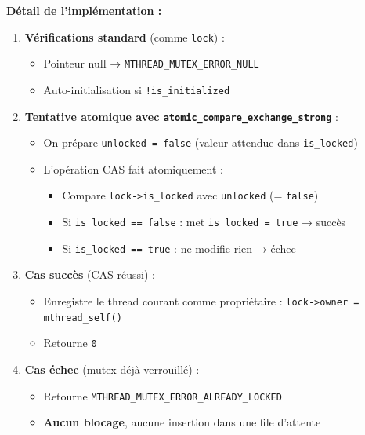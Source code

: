 \documentclass[11pt,a4paper]{article}
\let\oldtexttt\texttt
\renewcommand{\texttt}[1]{\oldtexttt{\color{keyword}#1}}
\begin{document}
\textbf{Détail de l'implémentation :}
\begin{enumerate}
  \item \textbf{Vérifications standard} (comme \texttt{lock}) :
  \begin{itemize}
    \item Pointeur null → \texttt{MTHREAD\_MUTEX\_ERROR\_NULL}
    \item Auto-initialisation si \texttt{!is\_initialized}
  \end{itemize}

  \item \textbf{Tentative atomique avec \texttt{atomic\_compare\_exchange\_strong}} :
  \begin{itemize}
    \item On prépare \texttt{unlocked = false} (valeur attendue dans \texttt{is\_locked})
    \item L'opération CAS fait atomiquement :
    \begin{itemize}
      \item Compare \texttt{lock->is\_locked} avec \texttt{unlocked} (= \texttt{false})
      \item Si \texttt{is\_locked == false} : met \texttt{is\_locked = true} → succès
      \item Si \texttt{is\_locked == true} : ne modifie rien → échec
    \end{itemize}
  \end{itemize}

  \item \textbf{Cas succès} (CAS réussi) :
  \begin{itemize}
    \item Enregistre le thread courant comme propriétaire : \texttt{lock->owner = mthread\_self()}
    \item Retourne \texttt{0}
  \end{itemize}

  \item \textbf{Cas échec} (mutex déjà verrouillé) :
  \begin{itemize}
    \item Retourne \texttt{MTHREAD\_MUTEX\_ERROR\_ALREADY\_LOCKED}
    \item \textbf{Aucun blocage}, aucune insertion dans une file d'attente
  \end{itemize}
\end{enumerate}
\end{document}
